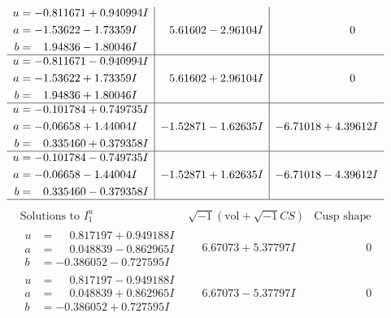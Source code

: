 \documentclass[1p]{elsarticle_modified}
\theoremstyle{definition}
\newcommand{\I}{\sqrt{-1}}
\begin{document}
$$\begin{array}{c|c|c}
\begin{aligned}
u &= -0.811671 + 0.940994 I \\
a &= -1.53622 - 1.73359 I \\
b &= \phantom{-}1.94836 - 1.80046 I\end{aligned}
 & \phantom{-}5.61602 - 2.96104 I & \phantom{-0.000000 } 0 \\ \hline\begin{aligned}
u &= -0.811671 - 0.940994 I \\
a &= -1.53622 + 1.73359 I \\
b &= \phantom{-}1.94836 + 1.80046 I\end{aligned}
 & \phantom{-}5.61602 + 2.96104 I & \phantom{-0.000000 } 0 \\ \hline\begin{aligned}
u &= -0.101784 + 0.749735 I \\
a &= -0.06658 + 1.44004 I \\
b &= \phantom{-}0.335460 + 0.379358 I\end{aligned}
 & -1.52871 - 1.62635 I & -6.71018 + 4.39612 I \\ \hline\begin{aligned}
u &= -0.101784 - 0.749735 I \\
a &= -0.06658 - 1.44004 I \\
b &= \phantom{-}0.335460 - 0.379358 I\end{aligned}
 & -1.52871 + 1.62635 I & -6.71018 - 4.39612 I\\
 \hline 
 \end{array}$$\newpage$$\begin{array}{c|c|c}  
\text{Solutions to }I^u_{1}& \I (\text{vol} + \sqrt{-1}CS) & \text{Cusp shape}\\
 \hline 
\begin{aligned}
u &= \phantom{-}0.817197 + 0.949188 I \\
a &= \phantom{-}0.048839 - 0.862965 I \\
b &= -0.386052 - 0.727595 I\end{aligned}
 & \phantom{-}6.67073 + 5.37797 I & \phantom{-0.000000 } 0 \\ \hline\begin{aligned}
u &= \phantom{-}0.817197 - 0.949188 I \\
a &= \phantom{-}0.048839 + 0.862965 I \\
b &= -0.386052 + 0.727595 I\end{aligned}
 & \phantom{-}6.67073 - 5.37797 I & \phantom{-0.000000 } 0 \\ \hline\begin{aligned}

\end{aligned}
\end{array}$$
\end{document}
